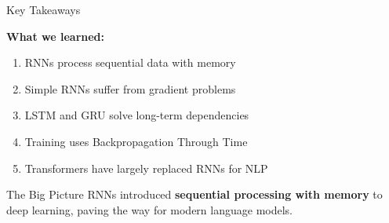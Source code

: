 \documentclass[usenames,dvipsnames]{beamer}
\begin{document}
	\begin{frame}{Key Takeaways}
		\begin{keypointsbox}
			\textbf{What we learned:}
			\begin{enumerate}
				\item RNNs process sequential data with memory
				\item Simple RNNs suffer from gradient problems
				\item LSTM and GRU solve long-term dependencies
				\item Training uses Backpropagation Through Time
				\item Transformers have largely replaced RNNs for NLP
			\end{enumerate}
		\end{keypointsbox}
		
		\begin{theorembox}{The Big Picture}
			RNNs introduced \textbf{sequential processing with memory} to deep learning, paving the way for modern language models.
		\end{theorembox}
	\end{frame}
\end{document}

